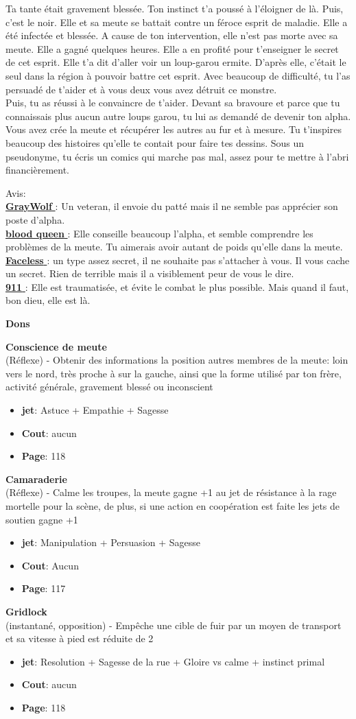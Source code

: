 \documentclass[oneside,12pt]{book}
\newcommand\don[6]{
\textbf{#1} \\
(#6) - #2
\begin{itemize}
\item{ \textbf{jet}: #3}
\item{ \textbf{Cout}: #4}
\item{ \textbf{Page}: #5}
\end{itemize}
\vspace{0.5cm}
}
\newcommand{\Glen}{\textbf{GrayWolf} }
\newcommand{\Laura}{\textbf{blood queen} }
\newcommand{\Andy}{\textbf{Faceless} }
\newcommand{\Kelly}{\textbf{911} }
\begin{document}
\begin{flushleft}
\begin{description}
{Ta tante était gravement blessée. Ton instinct t'a poussé à l'éloigner de là. Puis, c'est le noir. Elle et sa meute se battait contre un féroce esprit de maladie. Elle a été infectée et blessée.
A cause de ton intervention, elle n'est pas morte avec sa meute. Elle a gagné quelques heures. Elle a en profité pour t'enseigner le secret de cet esprit. Elle t'a dit d'aller voir un loup-garou ermite. D'après elle, c'était le seul dans la région à pouvoir battre cet esprit. Avec beaucoup de difficulté, tu l'as persuadé de t'aider et à vous deux vous avez détruit ce monstre. \\
Puis, tu as réussi à le convaincre de t'aider. Devant sa bravoure et parce que tu connaissais plus aucun autre loups garou, tu lui as demandé de devenir ton alpha. Vous avez crée la meute et récupérer les autres au fur et à mesure.
Tu t'inspires beaucoup des histoires qu'elle te contait pour faire tes dessins. Sous un pseudonyme, tu écris un comics qui marche pas mal, assez pour te mettre à l'abri financièrement.

Avis:\\
\underline{\Glen} : Un veteran, il envoie du patté mais il ne semble pas apprécier son poste d'alpha. \\
\underline{\Laura} : Elle conseille beaucoup l'alpha, et semble comprendre les problèmes de la meute. Tu aimerais avoir autant de poids qu'elle dans la meute.\\
\underline{\Andy}: un type assez secret, il ne souhaite pas s'attacher à vous. Il vous cache un secret. Rien de terrible mais il a visiblement peur de vous le dire.\\
\underline{\Kelly}: Elle est traumatisée, et évite le combat le plus possible. Mais quand il faut, bon dieu, elle est là.\\
}
\end{description}
\clearpage
\textbf{\large Dons}
\vspace{0.5cm}

\don{Conscience de meute}{Obtenir des informations la position autres membres de la meute: loin vers le nord, très proche à sur la gauche, ainsi que la forme utilisé par ton frère, activité générale, gravement blessé ou inconscient}{Astuce + Empathie + Sagesse}{aucun}{118}{Réflexe}
\don{Camaraderie}{Calme les troupes, la meute gagne +1 au jet de résistance à la rage mortelle pour la scène, de plus, si une action en coopération est faite les jets de soutien gagne +1}{Manipulation + Persuasion + Sagesse}{Aucun}{117}{Réflexe}
\don{Gridlock}{Empêche une cible de fuir par un moyen de transport et sa vitesse à pied est réduite de 2}{Resolution + Sagesse de la rue + Gloire vs calme + instinct primal}{aucun}{118}{instantané, opposition}



\end{flushleft}
\end{document}
